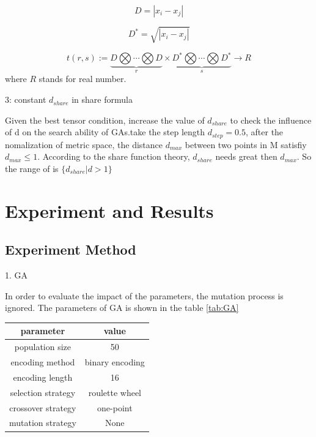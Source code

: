 \documentclass[smallextended]{svjour3}       %
\begin{document}
\begin{multicols}{2}
\begin{equation}
    D = |x_i-x_j|
\end{equation}

\begin{equation}
    D^{\ast} = \sqrt{|x_i-x_j|}
\end{equation}

\begin{equation}
t(r,s):= \underbrace{D \bigotimes \cdots \bigotimes D}_{r} \times \underbrace{D^{\ast} \bigotimes 
\cdots \bigotimes D^{\ast}}_{s} \rightarrow R
\end{equation}
where $R$ stands for real number.

3: constant $d_{share}$ in share formula


Given the best tensor condition, increase the value of $d_{share}$ to check the influence of d on the 
search ability of GAs.take the step length $d_{step}=0.5$, after the nomalization of metric space, the
distance $d_{max}$ between two points in M satisfiy $d_{max}\leq 1$. According to the share function 
theory, $d_{share}$ needs great then $d_{max}$. So the range of is $\{d_{share}|d > 1\}$

 


\section{Experiment and Results}

\subsection{Experiment Method}
1. GA

In order to evaluate the impact of the parameters, the mutation process is ignored. The parameters
of GA is shown in the table \ref{tab:GA}

\begin{center}
\begin{tabular}{cc}
	\toprule
	parameter & value \\
	\midrule
	population size      & 50 \\
    encoding method      & binary encoding\\
    encoding length      & 16 \\
	selection strategy   & roulette wheel  \\
	crossover strategy   & one-point \\
	mutation strategy    & None \\
	\bottomrule
\end{tabular}
\label{tab:GA}
\end{center}



\end{multicols}
\end{document}
